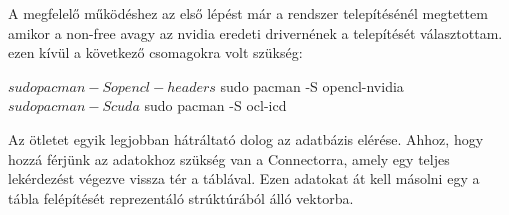 
A megfelelő működéshez az első lépést már a rendszer telepítésénél megtettem amikor a non-free avagy az nvidia eredeti drivernének a telepítését választottam.
ezen kívül a következő csomagokra volt szükség: 

\begin{python}
$ sudo pacman -S opencl-headers
$ sudo pacman -S opencl-nvidia
$ sudo pacman -S cuda
$ sudo pacman -S ocl-icd
\end{python}




Az ötletet egyik legjobban hátráltató dolog az adatbázis elérése. Ahhoz, hogy hozzá férjünk az adatokhoz szükség van a Connectorra, amely egy teljes lekérdezést végezve vissza tér a táblával. Ezen adatokat át kell másolni egy a tábla felépítését reprezentáló strúktúrából álló vektorba.



